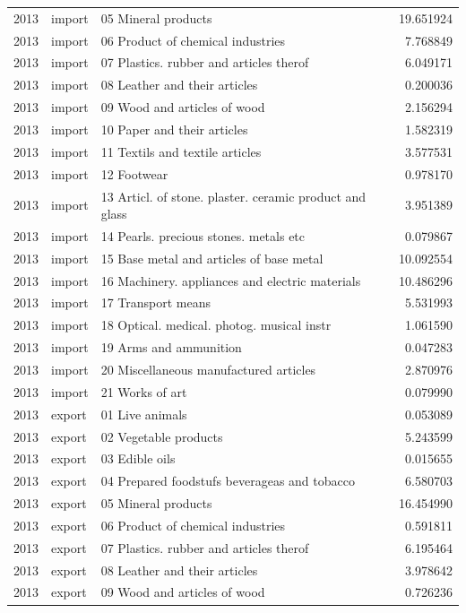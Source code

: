 \begin{tabular}{rllr}
2013 & import & 05 Mineral products & 19.651924 \\
2013 & import & 06 Product of chemical industries & 7.768849 \\
2013 & import & 07 Plastics. rubber and articles therof & 6.049171 \\
2013 & import & 08 Leather and their articles & 0.200036 \\
2013 & import & 09 Wood and articles of wood & 2.156294 \\
2013 & import & 10 Paper and their articles & 1.582319 \\
2013 & import & 11 Textils and textile articles & 3.577531 \\
2013 & import & 12 Footwear & 0.978170 \\
2013 & import & 13 Articl. of stone. plaster. ceramic product and glass & 3.951389 \\
2013 & import & 14 Pearls. precious stones. metals etc & 0.079867 \\
2013 & import & 15 Base metal and articles of base metal & 10.092554 \\
2013 & import & 16 Machinery. appliances and electric materials & 10.486296 \\
2013 & import & 17 Transport means & 5.531993 \\
2013 & import & 18 Optical. medical. photog. musical instr & 1.061590 \\
2013 & import & 19 Arms and ammunition & 0.047283 \\
2013 & import & 20 Miscellaneous manufactured articles & 2.870976 \\
2013 & import & 21 Works of art & 0.079990 \\
2013 & export & 01 Live animals & 0.053089 \\
2013 & export & 02 Vegetable products & 5.243599 \\
2013 & export & 03 Edible oils & 0.015655 \\
2013 & export & 04 Prepared foodstufs beverageas and tobacco & 6.580703 \\
2013 & export & 05 Mineral products & 16.454990 \\
2013 & export & 06 Product of chemical industries & 0.591811 \\
2013 & export & 07 Plastics. rubber and articles therof & 6.195464 \\
2013 & export & 08 Leather and their articles & 3.978642 \\
2013 & export & 09 Wood and articles of wood & 0.726236 \\

\end{tabular}
